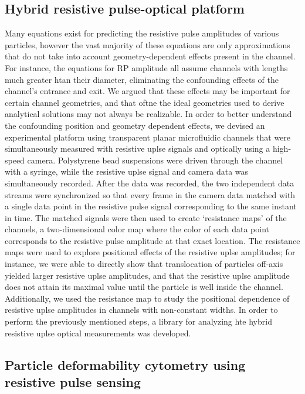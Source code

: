 	\subsection{Hybrid resistive pulse-optical platform}
	
		Many equations exist for predicting the resistive pulse amplitudes of various particles, however the vast majority of these equations are only approximations that do not take into account geometry-dependent effects present in the channel. For instance, the equations for RP amplitude all assume channels with lengths much greater htan their diameter, eliminating the confounding effects of the channel's entrance and exit. We argued that these effects may be important for certain channel geometries, and that oftne the ideal geometries used to derive analytical solutions may not always be realizable. In order to better understand the confounding position and geometry dependent effects, we devised an experimental platform using transparent planar microfluidic channels that were simultaneously measured with resistive uplse signals and optically using a high-speed camera. Polystyrene bead suspensions were driven through the channel with a syringe, while the resistive uplse signal and camera data was simultaneously recorded. After the data was recorded, the two independent data streams were synchronized so that every frame in the camera data matched with a single data point in the resistive pulse signal corresponding to the same instant in time. The matched signals were then used to create `resistance maps' of the channels, a two-dimensional color map where the color of each data point corresponds to the resistive pulse amplitude at that exact location. The resistance maps were used to explore positional effects of the resistive uplse amplitudes; for instance, we were able to directly show that translocation of particles off-axis yielded larger resistive uplse amplitudes, and that the resistive uplse amplitude does not attain its maximal value until the particle is well inside the channel. Additionally, we used the resistance map to study the positional dependence of resistive uplse amplitudes in channels with non-constant widths. In order to perform the previously mentioned steps, a library for analyzing hte hybrid resistive uplse optical measurements was developed.
		
	\subsection{Particle deformability cytometry using resistive pulse sensing}
	
